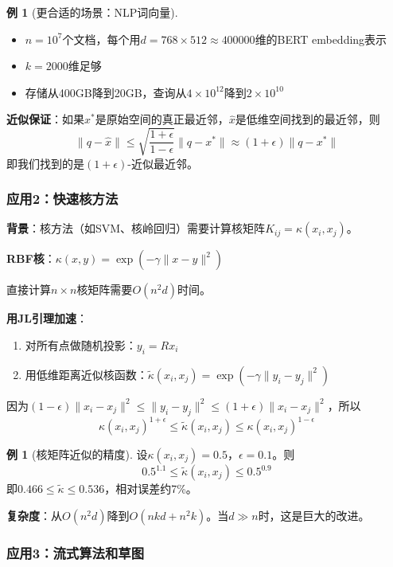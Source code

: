 \documentclass[11pt,a4paper]{ctexart}
\theoremstyle{definition}
\newtheorem{example}[theorem]{例}
\theoremstyle{remark}
\begin{document}
\begin{example}[更合适的场景：NLP词向量]
\begin{itemize}
    \item $n = 10^7$个文档，每个用$d = 768 \times 512 \approx 400000$维的BERT embedding表示
    \item $k = 2000$维足够
    \item 存储从400GB降到20GB，查询从$4 \times 10^{12}$降到$2 \times 10^{10}$
\end{itemize}
\end{example}

\textbf{近似保证}：如果$x^*$是原始空间的真正最近邻，$\hat{x}$是低维空间找到的最近邻，则
\[
\|q - \hat{x}\| \leq \sqrt{\frac{1+\epsilon}{1-\epsilon}} \|q - x^*\| \approx (1+\epsilon)\|q - x^*\|
\]
即我们找到的是$(1+\epsilon)$-近似最近邻。

\subsubsection{应用2：快速核方法}

\textbf{背景}：核方法（如SVM、核岭回归）需要计算核矩阵$K_{ij} = \kappa(x_i, x_j)$。

\textbf{RBF核}：$\kappa(x, y) = \exp(-\gamma\|x - y\|^2)$

直接计算$n \times n$核矩阵需要$O(n^2 d)$时间。

\textbf{用JL引理加速}：
\begin{enumerate}
    \item 对所有点做随机投影：$y_i = Rx_i$
    \item 用低维距离近似核函数：$\tilde{\kappa}(x_i, x_j) = \exp(-\gamma\|y_i - y_j\|^2)$
\end{enumerate}

因为$(1-\epsilon)\|x_i - x_j\|^2 \leq \|y_i - y_j\|^2 \leq (1+\epsilon)\|x_i - x_j\|^2$，所以
\[
\kappa(x_i, x_j)^{1+\epsilon} \leq \tilde{\kappa}(x_i, x_j) \leq \kappa(x_i, x_j)^{1-\epsilon}
\]

\begin{example}[核矩阵近似的精度]
设$\kappa(x_i, x_j) = 0.5$，$\epsilon = 0.1$。则
\[
0.5^{1.1} \leq \tilde{\kappa}(x_i, x_j) \leq 0.5^{0.9}
\]
即$0.466 \leq \tilde{\kappa} \leq 0.536$，相对误差约7\%。
\end{example}

\textbf{复杂度}：从$O(n^2 d)$降到$O(nkd + n^2 k)$。当$d \gg n$时，这是巨大的改进。

\subsubsection{应用3：流式算法和草图}
\end{document}

